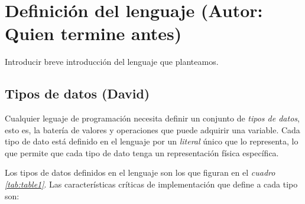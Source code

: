 \documentclass[11pt, english]{article}
\begin{document}
\newcommand{\CC}{C\nolinebreak\hspace{-.05em}\raisebox{.4ex}{\tiny\bf +}\nolinebreak\hspace{-.10em}\raisebox{.4ex}{\tiny\bf +}}
\def\CC{{C\nolinebreak[4]\hspace{-.05em}\raisebox{.4ex}{\tiny\bf ++}}}

\tableofcontents
\newpage

\section{Definición del lenguaje (Autor: Quien termine antes)}
Introducir breve introducción del lenguaje que planteamos.
\newpage

\subsection{Tipos de datos (David)}
Cualquier leguaje de programación necesita definir un conjunto de \emph{tipos de datos}, esto es, la batería de valores y operaciones que puede adquirir una variable. Cada tipo de dato está definido en el lenguaje por un \emph{literal} único que lo representa, lo que permite que cada tipo de dato tenga un representación física específica.

Los tipos de datos definidos en el lenguaje son los que figuran en el \emph{cuadro \ref{tab:table1}}. Las características críticas de implementación que define a cada tipo son:
\end{document}
